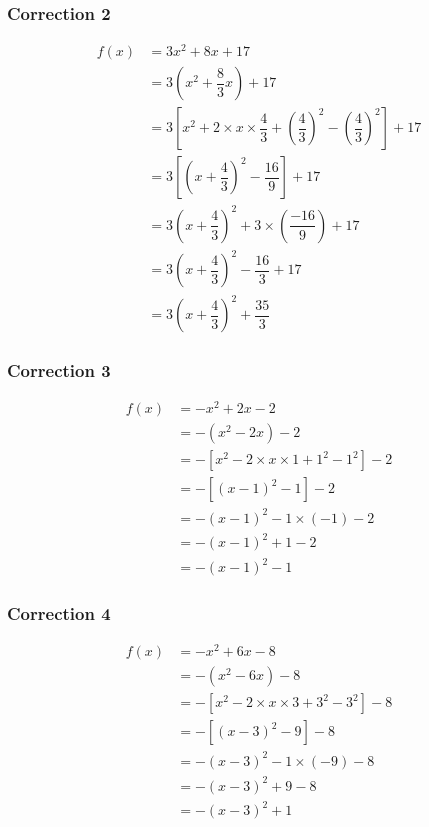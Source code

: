 \documentclass[15pt, mathserif]{beamer}
\begin{document}
\begin{frame}
\vspace{-10mm}
	\frametitle{Correction 2}
\begin{align*} f(x) &= 3x^2+8x+17\\ 
&=3\left(x^2+\dfrac{8}{3}x\right)+17\\ 
&=3\left[x^2+2\times x \times\dfrac{4}{3}+\left(\dfrac{4}{3}\right)^2- \left(\dfrac{4}{3}\right)^2\right]+17\\ 
&=3\left[ \left( x+\dfrac{4}{3}\right)^2-\dfrac{16}{9}\right]+17\\ 
&=3 \left( x+\dfrac{4}{3}\right)^2+3\times \left(\dfrac{-16}{9}\right)+17\\ 
&=3 \left( x+\dfrac{4}{3}\right)^2-\dfrac{16}{3}+17\\ 
&=3 \left( x+\dfrac{4}{3}\right)^2+\dfrac{35}{3}
 \end{align*} 

 \bigskip\end{frame}


\begin{frame}
\vspace{-10mm}
	\frametitle{Correction 3}
\begin{align*} f(x) &= -x^2+2x-2\\ 
&=-\left(x^2-2x\right)-2\\ 
&=-\left[x^2-2\times x \times1+1^2-1^2\right]-2\\ 
&=-\left[ \left( x-1\right)^2-1\right]-2\\ 
&=- \left( x-1\right)^2-1\times \left(-1\right)-2\\ 
&=- \left( x-1\right)^2+1-2\\ 
&=- \left( x-1\right)^2-1
 \end{align*} 

 \bigskip\end{frame}


\begin{frame}
\vspace{-10mm}
	\frametitle{Correction 4}
\begin{align*} f(x) &= -x^2+6x-8\\ 
&=-\left(x^2-6x\right)-8\\ 
&=-\left[x^2-2\times x \times3+3^2-3^2\right]-8\\ 
&=-\left[ \left( x-3\right)^2-9\right]-8\\ 
&=- \left( x-3\right)^2-1\times \left(-9\right)-8\\ 
&=- \left( x-3\right)^2+9-8\\ 
&=- \left( x-3\right)^2+1
 \end{align*} 

 \bigskip\end{frame}
\end{document}
